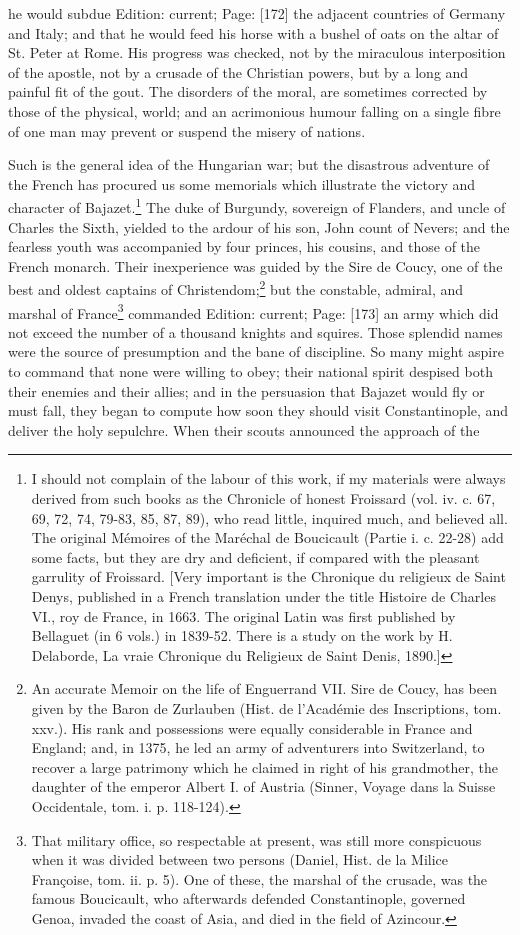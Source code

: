 he would subdue Edition: current; Page: [172] the adjacent countries of Germany and Italy; and that he would feed his horse with a bushel of oats on the altar of St. Peter at Rome. His progress was checked, not by the miraculous interposition of the apostle, not by a crusade of the Christian powers, but by a long and painful fit of the gout. The disorders of the moral, are sometimes corrected by those of the physical, world; and an acrimonious humour falling on a single fibre of one man may prevent or suspend the misery of nations.

Such is the general idea of the Hungarian war; but the disastrous adventure of the French has procured us some memorials which illustrate the victory and character of Bajazet.\footnote{I should not complain of the labour of this work, if my materials were always derived from such books as the Chronicle of honest Froissard (vol. iv. c. 67, 69, 72, 74, 79-83, 85, 87, 89), who read little, inquired much, and believed all. The original Mémoires of the Maréchal de Boucicault (Partie i. c. 22-28) add some facts, but they are dry and deficient, if compared with the pleasant garrulity of Froissard. [Very important is the Chronique du religieux de Saint Denys, published in a French translation under the title Histoire de Charles VI., roy de France, in 1663. The original Latin was first published by Bellaguet (in 6 vols.) in 1839-52. There is a study on the work by H. Delaborde, La vraie Chronique du Religieux de Saint Denis, 1890.]} The duke of Burgundy, sovereign of Flanders, and uncle of Charles the Sixth, yielded to the ardour of his son, John count of Nevers; and the fearless youth was accompanied by four princes, his cousins, and those of the French monarch. Their inexperience was guided by the Sire de Coucy, one of the best and oldest captains of Christendom;\footnote{An accurate Memoir on the life of Enguerrand VII. Sire de Coucy, has been given by the Baron de Zurlauben (Hist. de l\texthebrew{}’Académie des Inscriptions, tom. xxv.). His rank and possessions were equally considerable in France and England; and, in 1375, he led an army of adventurers into Switzerland, to recover a large patrimony which he claimed in right of his grandmother, the daughter of the emperor Albert I. of Austria (Sinner, Voyage dans la Suisse Occidentale, tom. i. p. 118-124).} but the constable, admiral, and marshal of France\footnote{That military office, so respectable at present, was still more conspicuous when it was divided between two persons (Daniel, Hist. de la Milice Françoise, tom. ii. p. 5). One of these, the marshal of the crusade, was the famous Boucicault, who afterwards defended Constantinople, governed Genoa, invaded the coast of Asia, and died in the field of Azincour.} commanded Edition: current; Page: [173] an army which did not exceed the number of a thousand knights and squires. Those splendid names were the source of presumption and the bane of discipline. So many might aspire to command that none were willing to obey; their national spirit despised both their enemies and their allies; and in the persuasion that Bajazet would fly or must fall, they began to compute how soon they should visit Constantinople, and deliver the holy sepulchre. When their scouts announced the approach of the 